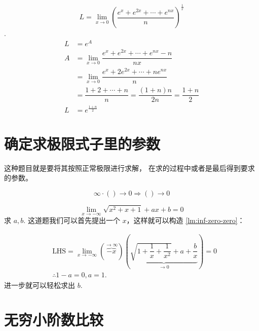 \begin{example}
    \[
        L =\lim_{x \to 0} \left(
            \dfrac{
                e^x +e^{2x} +\cdots +e^{nx}
            }{n}
        \right)^{\frac{1}{x}}
    \]
    \cite[page 51, question 1]{yc}.
    \begin{align*}
        L &= e^A \\
        A &= \lim_{x \to 0} \dfrac{e^x +e^{2x} +\cdots +e^{nx} -n}{nx}\\
          &= \lim_{x \to 0} \dfrac{e^x +2e^{2x} +\cdots +ne^{nx}}{n}\\
          &= \dfrac{1 + 2 + \cdots + n }{n} = \dfrac{(1 +n)n}{2n} = \dfrac{1+n}{2}\\
        L &= e^{\frac{1+n}{2}}
    \end{align*}
\end{example}

\section{确定求极限式子里的参数}

这种题目就是要将其按照正常极限进行求解，
在求的过程中或者是最后得到要求的参数。

\begin{lemma} \label{lm:inf-zero-zero}
	\begin{equation}
		\infty \cdot () \to 0 \Rightarrow () \to 0
	\end{equation}

\end{lemma}

\begin{example}
    \[
        \lim_{x \to -\infty} \sqrt{x^2+x+1} +  ax + b = 0
    \]
    求 $a, b.$
    这道题我们可以首先提出一个 $x$，这样就可以构造 \ref{lm:inf-zero-zero}：

    \begin{align*}
        &\mbox{LHS} = \lim_{x \to -\infty} \left(\overbrace{-x}^{ \to \infty }\right)
        \left( 
        \underbrace{\sqrt{1+\dfrac{1}{x}+\dfrac{1}{x^2}} + a + \dfrac{b}{x}}_{\to 0}
        \right) = 0\\
        &\therefore 1-a = 0, a = 1.
    \end{align*}
    进一步就可以轻松求出 $b$.
\end{example}

\section{无穷小阶数比较}

